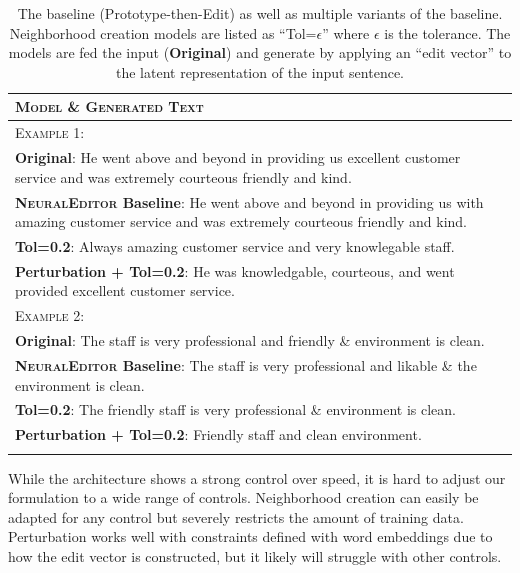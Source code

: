   \begin{table}[htb]
  \small
  \centering
  \caption{The baseline \citep{guu2018generating} (Prototype-then-Edit) as well as multiple variants of the baseline. Neighborhood creation models are listed as ``Tol=$\epsilon$'' where $\epsilon$ is the tolerance. The models are fed the input (\ie \textbf{Original}) and generate by applying an ``edit vector'' to the latent representation of the input sentence.}
  \label{tab:ne_example} 
  \begin{tabularx}{\linewidth}{@{}>{\raggedright\arraybackslash}X@{}}
   \toprule[1.5pt]
  \textsc{Model} \& \textsc{Generated Text}\\
  \midrule[0.75pt]
  \textsc{Example 1:}\\
  \textbf{Original}: He went above and beyond in providing us excellent customer service and was extremely courteous friendly and kind.  \\
  \textbf{\textsc{NeuralEditor} Baseline}: He went above and beyond in providing us with amazing customer service and was extremely courteous friendly and kind.  \\
  \textbf{Tol=0.2}: Always amazing customer service and very knowlegable staff. \\
  \textbf{Perturbation + Tol=0.2}: He was knowledgable, courteous, and went provided excellent customer service.\\
  \addlinespace[0.5em]
  \textsc{Example 2:}\\
  \textbf{Original}: The staff is very professional and friendly \& environment is clean.  \\
  \textbf{\textsc{NeuralEditor} Baseline}: The staff is very professional and likable \& the environment is clean. \\
  \textbf{Tol=0.2}: The friendly staff is very professional \& environment is clean. \\
  \textbf{Perturbation + Tol=0.2}: Friendly staff and clean environment.\\
  \bottomrule[1.5pt]\\
  \end{tabularx}
  \vspace{-10px}
  \end{table}

While the architecture shows a strong control over speed, it is hard to adjust our formulation to a wide range of controls. Neighborhood creation can easily be adapted for any control but severely restricts the amount of training data. Perturbation works well with constraints defined with word embeddings due to how the edit vector is constructed, but it likely will struggle with other controls. 

